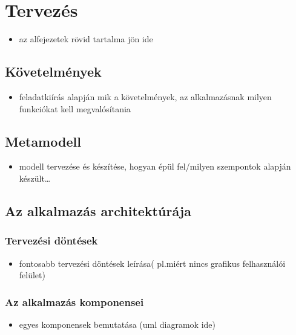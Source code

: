 \chapter{Tervezés}
\label{chp:design}
\begin{itemize}
  \item az alfejezetek rövid tartalma jön ide
\end{itemize}

\section{Követelmények}
\begin{itemize}
  \item feladatkiírás alapján mik a követelmények, az alkalmazásnak milyen funkciókat kell megvalósítania
\end{itemize}

\section{Metamodell}

\begin{itemize}
  \item modell tervezése és készítése, hogyan épül fel/milyen szempontok alapján készült\ldots
\end{itemize}

\section{Az alkalmazás architektúrája}

%
\subsection{Tervezési döntések}
%
\begin{itemize}
  \item fontosabb tervezési döntések leírása( pl.miért nincs grafikus felhasználói felület)
\end{itemize}

%
\subsection{Az alkalmazás komponensei}
%
\begin{itemize}
  \item egyes komponensek bemutatása (uml diagramok ide)
\end{itemize}